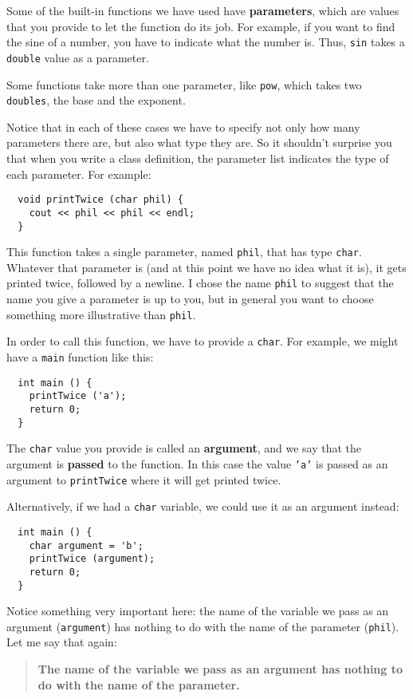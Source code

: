 Some of the built-in functions we have used have {\bf parameters},
which are values that you provide to let the function do its
job.  For example, if you want to find the sine of a number,
you have to indicate what the number is.  Thus, {\tt sin}
takes a {\tt double} value as a parameter.

Some functions take more than one parameter, like {\tt pow},
which takes two {\tt doubles}, the base and the exponent.

Notice that in each of these cases we have to specify not
only how many parameters there are, but also what type they
are.  So it shouldn't surprise you that when you write a
class definition, the parameter list indicates the type of
each parameter.  For example:

\begin{lstlisting}
  void printTwice (char phil) {
    cout << phil << phil << endl;
  }
\end{lstlisting}
%
This function takes a single parameter, named {\tt phil}, that
has type {\tt char}.  Whatever that parameter is (and at
this point we have no idea what it is), it gets printed
twice, followed by a newline.
I chose the name {\tt phil} to suggest that the name
you give a parameter is up to you, but in general you want to
choose something more illustrative than {\tt phil}.

In order to call this function, we have to provide a {\tt char}.
For example, we might have a {\tt main} function like this:

\begin{lstlisting}
  int main () {
    printTwice ('a');
    return 0;
  }
\end{lstlisting}
%
The {\tt char} value you provide is called an {\bf argument}, and we
say that the argument is {\bf passed} to the function.  In this
case the value {\tt 'a'} is passed as an argument
to {\tt printTwice} where it will get printed twice.

Alternatively, if we had a {\tt char} variable, we could
use it as an argument instead:

\begin{lstlisting}
  int main () {
    char argument = 'b';
    printTwice (argument);
    return 0;
  }
\end{lstlisting}
%
Notice something very important here: the name of the variable we pass
as an argument ({\tt argument}) has nothing to do with the name of the
parameter ({\tt phil}).  Let me say that again:

\begin{quote}

{\bf The name of the variable we pass as an argument has nothing to do
with the name of the parameter.}

\end{quote}

